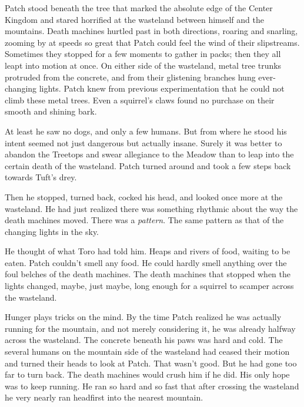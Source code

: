 \documentclass[12pt]{book}
\begin{document}
 Patch stood beneath the tree that marked the absolute edge of the Center Kingdom and stared horrified at the wasteland between himself and the mountains. Death machines hurtled past in both directions, roaring and snarling, zooming by at speeds so great that Patch could feel the wind of their slipstreams. Sometimes they stopped for a few moments to gather in packs; then they all leapt into motion at once. On either side of the wasteland, metal tree trunks protruded from the concrete, and from their glistening branches hung ever-changing lights. Patch knew from previous experimentation that he could not climb these metal trees. Even a squirrel's claws found no purchase on their smooth and shining bark.\par
 At least he saw no dogs, and only a few humans. But from where he stood his intent seemed not just dangerous but actually insane. Surely it was better to abandon the Treetops and swear allegiance to the Meadow than to leap into the certain death of the wasteland. Patch turned around and took a few steps back towards Tuft's drey.\par
 Then he stopped, turned back, cocked his head, and looked once more at the wasteland. He had just realized there was something rhythmic about the way the death machines moved. There was a {\it pattern}. The same pattern as that of the changing lights in the sky.\par
 He thought of what Toro had told him. Heaps and rivers of food, waiting to be eaten. Patch couldn't smell any food. He could hardly smell anything over the foul belches of the death machines. The death machines that stopped when the lights changed, maybe, just maybe, long enough for a squirrel to scamper across the wasteland.\par
 Hunger plays tricks on the mind. By the time Patch realized he was actually running for the mountain, and not merely considering it, he was already halfway across the wasteland. The concrete beneath his paws was hard and cold. The several humans on the mountain side of the wasteland had ceased their motion and turned their heads to look at Patch. That wasn't good. But he had gone too far to turn back. The death machines would crush him if he did. His only hope was to keep running. He ran so hard and so fast that after crossing the wasteland he very nearly ran headfirst into the nearest mountain.\par
\end{document}
